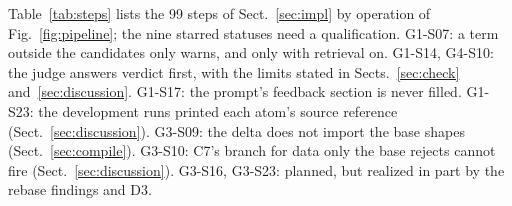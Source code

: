 Table~\ref{tab:steps} lists the 99 steps of Sect.~\ref{sec:impl} by operation of Fig.~\ref{fig:pipeline}; the nine %
starred statuses need a qualification. 
\mbox{G1-S07}: a term outside the candidates only warns, and only with retrieval on. %
\mbox{G1-S14}, \mbox{G4-S10}: the judge answers verdict first, with the limits stated in %
Sects.~\ref{sec:check} and~\ref{sec:discussion}.
\mbox{G1-S17}: the prompt's feedback section is never filled. %
\mbox{G1-S23}: the development runs printed each atom's source reference (Sect.~\ref{sec:discussion}). %
\mbox{G3-S09}: the delta does not import the base shapes (Sect.~\ref{sec:compile}). %
\mbox{G3-S10}: C7's branch for data only the base rejects cannot fire (Sect.~\ref{sec:discussion}). %
\mbox{G3-S16}, \mbox{G3-S23}: planned, but realized in part by the rebase findings and D3. %

